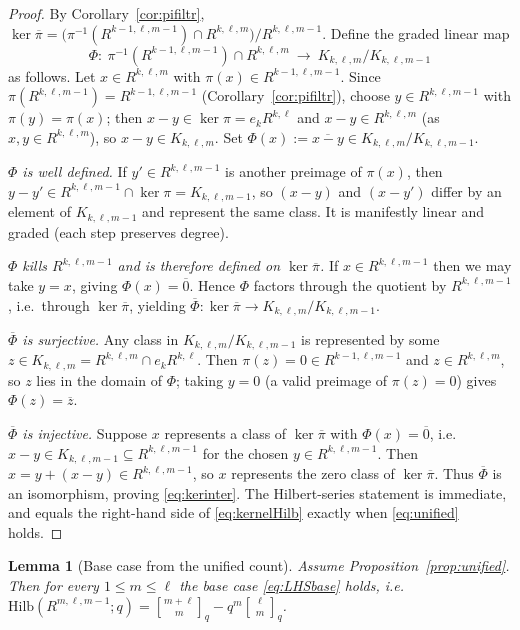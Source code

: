 \documentclass{amsart}
\newtheorem{lemma}{Lemma}
\theoremstyle{definition}
\newcommand{\Hilb}{\mathrm{Hilb}}
\newcommand{\qbin}[2]{\genfrac{[}{]}{0pt}{}{#1}{#2}_q}
\newcommand{\rkl}{R^{k,\ell}}
\newcommand{\Rklm}{R^{k,\ell,m}}
\begin{document}
\begin{proof}
By Corollary~\ref{cor:pifiltr},
$\ker\overline\pi=\big(\pi^{-1}(R^{k-1,\ell,m-1})\cap\Rklm\big)\big/R^{k,\ell,m-1}$.
Define the graded linear map
\[
\Phi\colon\ \pi^{-1}(R^{k-1,\ell,m-1})\cap\Rklm\ \longrightarrow\ K_{k,\ell,m}\big/K_{k,\ell,m-1}
\]
as follows. Let $x\in\Rklm$ with $\pi(x)\in R^{k-1,\ell,m-1}$. Since
$\pi(R^{k,\ell,m-1})=R^{k-1,\ell,m-1}$ (Corollary~\ref{cor:pifiltr}), choose
$y\in R^{k,\ell,m-1}$ with $\pi(y)=\pi(x)$; then $x-y\in\ker\pi=e_k\rkl$ and
$x-y\in\Rklm$ (as $x,y\in\Rklm$), so $x-y\in K_{k,\ell,m}$. Set
$\Phi(x):=\overline{x-y}\in K_{k,\ell,m}/K_{k,\ell,m-1}$.

\emph{$\Phi$ is well defined.} If $y'\in R^{k,\ell,m-1}$ is another preimage of
$\pi(x)$, then $y-y'\in R^{k,\ell,m-1}\cap\ker\pi=K_{k,\ell,m-1}$, so $(x-y)$ and
$(x-y')$ differ by an element of $K_{k,\ell,m-1}$ and represent the same class. It is
manifestly linear and graded (each step preserves degree).

\emph{$\Phi$ kills $R^{k,\ell,m-1}$ and is therefore defined on $\ker\overline\pi$.}
If $x\in R^{k,\ell,m-1}$ then we may take $y=x$, giving $\Phi(x)=\overline{0}$. Hence
$\Phi$ factors through the quotient by $R^{k,\ell,m-1}$, i.e.\ through
$\ker\overline\pi$, yielding $\overline\Phi\colon\ker\overline\pi\to
K_{k,\ell,m}/K_{k,\ell,m-1}$.

\emph{$\overline\Phi$ is surjective.} Any class in $K_{k,\ell,m}/K_{k,\ell,m-1}$ is
represented by some $z\in K_{k,\ell,m}=\Rklm\cap e_k\rkl$. Then $\pi(z)=0\in
R^{k-1,\ell,m-1}$ and $z\in\Rklm$, so $z$ lies in the domain of $\Phi$; taking
$y=0$ (a valid preimage of $\pi(z)=0$) gives $\Phi(z)=\overline z$.

\emph{$\overline\Phi$ is injective.} Suppose $x$ represents a class of
$\ker\overline\pi$ with $\Phi(x)=\overline{0}$, i.e.\ $x-y\in K_{k,\ell,m-1}\subseteq
R^{k,\ell,m-1}$ for the chosen $y\in R^{k,\ell,m-1}$. Then $x=y+(x-y)\in
R^{k,\ell,m-1}$, so $x$ represents the zero class of $\ker\overline\pi$. Thus
$\overline\Phi$ is an isomorphism, proving \eqref{eq:kerinter}. The Hilbert-series
statement is immediate, and equals the right-hand side of \eqref{eq:kernelHilb}
exactly when \eqref{eq:unified} holds.
\end{proof}

\begin{lemma}[Base case from the unified count]\label{lem:basefromU}
Assume Proposition~\ref{prop:unified}. Then for every $1\le m\le\ell$ the base case
\eqref{eq:LHSbase} holds, i.e.\ $\Hilb(R^{m,\ell,m-1};q)=\qbin{m+\ell}{m}-q^{m}\qbin{\ell}{m}$.
\end{lemma}
\end{document}
